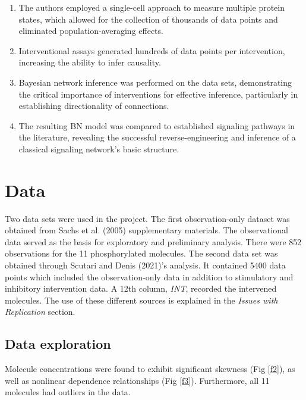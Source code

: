 \documentclass[twocol]{ametsoc}
\providecommand{\tightlist}{%
  \setlength{\itemsep}{0pt}\setlength{\parskip}{0pt}}
\begin{document}
\begin{enumerate}
\def\labelenumi{\arabic{enumi}.}
\tightlist
\item
  The authors employed a single-cell approach to measure multiple
  protein states, which allowed for the collection of thousands of data
  points and eliminated population-averaging effects.
\item
  Interventional assays generated hundreds of data points per
  intervention, increasing the ability to infer causality.
\item
  Bayesian network inference was performed on the data sets,
  demonstrating the critical importance of interventions for effective
  inference, particularly in establishing directionality of connections.
\item
  The resulting BN model was compared to established signaling pathways
  in the literature, revealing the successful reverse-engineering and
  inference of a classical signaling network's basic structure.
\end{enumerate}

\hypertarget{data}{%
\section{Data}\label{data}}

Two data sets were used in the project. The first observation-only
dataset was obtained from Sachs et al. (2005) supplementary materials.
The observational data served as the basis for exploratory and
preliminary analysis. There were 852 observations for the 11
phosphorylated molecules. The second data set was obtained through
Scutari and Denis (2021)'s analysis. It contained 5400 data points which
included the observation-only data in addition to stimulatory and
inhibitory intervention data. A 12th column, \emph{INT}, recorded the
intervened molecules. The use of these different sources is explained in
the \emph{Issues with Replication} section.

\hypertarget{data-exploration}{%
\subsection{Data exploration}\label{data-exploration}}

Molecule concentrations were found to exhibit significant skewness (Fig
\ref{f2}), as well as nonlinear dependence relationships (Fig \ref{f3}).
Furthermore, all 11 molecules had outliers in the data.
\end{document}
